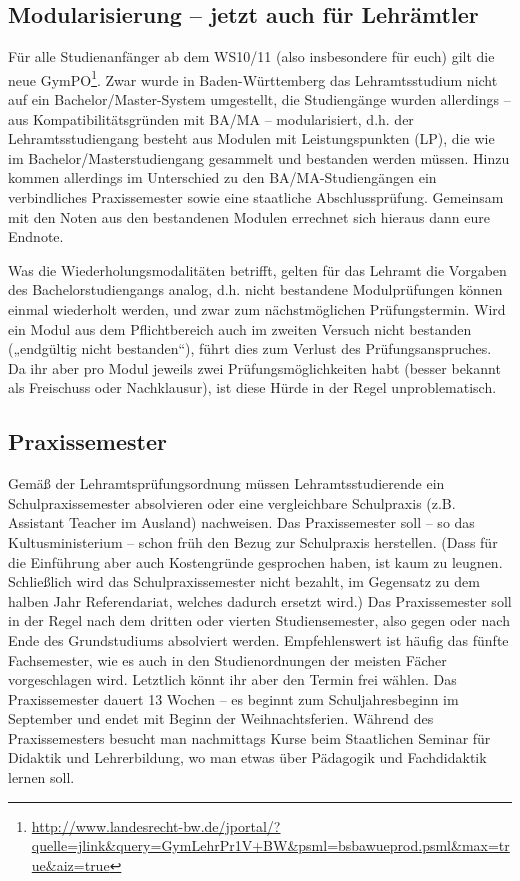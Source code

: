 \vspace*{-2\parskip}

\subsection{Modularisierung -- jetzt auch für Lehrämtler}

Für alle Studienanfänger ab dem WS10/11 (also insbesondere für euch) gilt die
neue
\gls{GymPO}\footnote{\url{
http://www.landesrecht-bw.de/jportal/?quelle=jlink&query=GymLehrPr1V+BW&psml=bsbawueprod.psml&max=true&aiz=true}}. Zwar wurde in Baden-Württemberg das Lehramtsstudium nicht auf
ein Bachelor/Master-System umgestellt, die Studiengänge wurden allerdings -- aus
Kompatibilitätsgründen mit BA/MA -- modularisiert, d.h. der Lehramtsstudiengang besteht aus Modulen
mit Leistungspunkten (LP), die wie im Bachelor/Masterstudiengang gesammelt und bestanden werden
müssen. Hinzu kommen allerdings im Unterschied zu den BA/MA-Studiengängen ein verbindliches
Praxissemester sowie eine staatliche Abschlussprüfung. Gemeinsam mit den Noten aus den bestandenen
Modulen errechnet sich hieraus dann eure Endnote.

Was die Wiederholungsmodalitäten betrifft, gelten für das Lehramt die Vorgaben des
Bachelorstudiengangs analog,
d.h. nicht bestandene Modulprüfungen können einmal  wiederholt  werden, und zwar zum nächstmöglichen
Prüfungstermin. Wird ein Modul aus dem Pflichtbereich auch im zweiten Versuch nicht bestanden
(„endgültig nicht bestanden“), führt dies zum Verlust des Prüfungsanspruches. Da ihr aber
pro Modul jeweils zwei Prüfungsmöglichkeiten habt (besser bekannt als Freischuss oder Nachklausur),
ist diese Hürde in der Regel unproblematisch.

\subsection{Praxissemester}

Gemäß der Lehramtsprüfungsordnung müssen Lehramtsstudierende ein Schulpraxissemester absolvieren oder eine vergleichbare Schulpraxis (z.B. Assistant Teacher im Ausland) nachweisen.  Das Praxissemester soll -- so das Kultusministerium -- schon früh den Bezug zur Schulpraxis herstellen. (Dass für die Einführung aber auch Kostengründe gesprochen haben, ist kaum zu leugnen. Schließlich wird das Schulpraxissemester nicht bezahlt, im Gegensatz zu dem halben Jahr Referendariat, welches dadurch ersetzt wird.)  Das Praxissemester soll in der Regel nach dem dritten oder vierten Studiensemester, also gegen oder nach Ende des Grundstudiums absolviert werden. Empfehlenswert ist häufig das fünfte Fachsemester, wie es auch in den Studienordnungen der meisten Fächer vorgeschlagen wird. Letztlich könnt ihr aber den Termin frei wählen. Das Praxissemester dauert 13 Wochen – es beginnt zum Schuljahresbeginn im September und endet mit Beginn der Weihnachtsferien.
Während des Praxissemesters besucht man nachmittags Kurse beim Staatlichen Seminar für Didaktik und Lehrerbildung, wo man etwas über Pädagogik und Fachdidaktik lernen soll.

